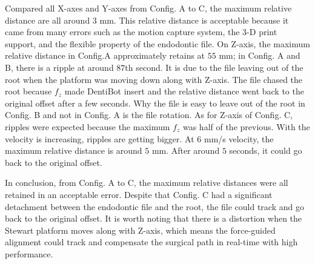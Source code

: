 Compared all X-axes and Y-axes from Config. A to C, the maximum relative distance are all around $3$ mm. This relative distance is acceptable because it came from many errors such as the motion capture system, the 3-D print support, and the flexible property of the endodontic file. On Z-axis, the maximum relative distance in Config.A approximately retains at $55$ mm; in Config. A and B, there is a ripple at around $87$th second. It is due to the file leaving out of the root when the platform was moving down along with Z-axis. The file chased the root because $f_z$ made DentiBot insert and the relative distance went back to the original offset after a few seconds. Why the file is easy to leave out of the root in Config. B and not in Config. A is the file rotation. As for Z-axis of Config. C, ripples were expected because the maximum $f_z$ was half of the previous. With the velocity is increasing, ripples are getting bigger. At $6$ mm/s velocity, the maximum relative distance is around $5$ mm. After around $5$ seconds, it could go back to the original offset.
\par
In conclusion, from Config. A to C, the maximum relative distances were all retained in an acceptable error. Despite that Config. C had a significant detachment between the endodontic file and the root, the file could track and go back to the original offset. It is worth noting that there is a distortion when the Stewart platform moves along with Z-axis, which means the force-guided alignment could track and compensate the surgical path in real-time with high performance.

